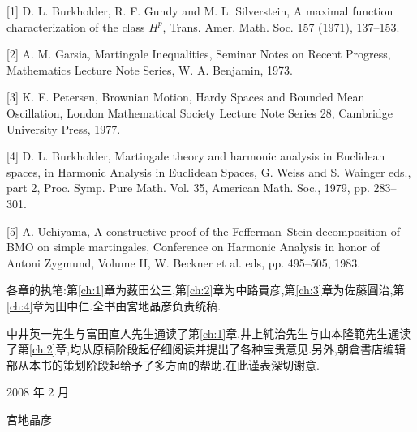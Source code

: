 [1] D. L. Burkholder, R. F. Gundy and M. L. Silverstein, A maximal function characterization of the class $H^{p}$, Trans. Amer. Math. Soc. 157 (1971), 137--153.

[2] A. M. Garsia, Martingale Inequalities, Seminar Notes on Recent Progress, Mathematics Lecture Note Series, W. A. Benjamin, 1973.

[3] K. E. Petersen, Brownian Motion, Hardy Spaces and Bounded Mean Oscillation, London Mathematical Society Lecture Note Series 28, Cambridge University Press, 1977.

[4] D. L. Burkholder, Martingale theory and harmonic analysis in Euclidean spaces, in Harmonic Analysis in Euclidean Spaces, G. Weiss and S. Wainger eds., part 2, Proc. Symp. Pure Math. Vol. 35, American Math. Soc., 1979, pp. 283--301.

[5] A. Uchiyama, A constructive proof of the Fefferman--Stein decomposition of BMO on simple martingales, Conference on Harmonic Analysis in honor of Antoni Zygmund, Volume II, W. Beckner et al. eds, pp. 495--505, 1983.

各章的执笔:第\ref{ch:1}章为薮田公三,第\ref{ch:2}章为中路貴彦,第\ref{ch:3}章为佐藤圓治,第\ref{ch:4}章为田中仁.全书由宮地晶彦负责统稿.

中井英一先生与富田直人先生通读了第\ref{ch:1}章,井上純治先生与山本隆範先生通读了第\ref{ch:2}章,均从原稿阶段起仔细阅读并提出了各种宝贵意见.另外,朝倉書店编辑部从本书的策划阶段起给予了多方面的帮助.在此谨表深切谢意.

2008 年 2 月

宮地晶彦
